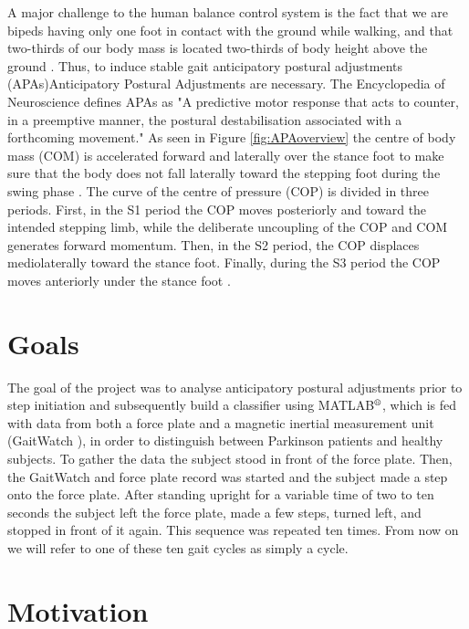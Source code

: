 A major challenge to the human balance control system is the fact that we are bipeds having only one foot in contact with the ground while walking, and that two-thirds  of our body mass is located two-thirds of body height above the ground \cite{halliday_initiation_1998}. Thus, to induce stable gait anticipatory postural adjustments (APAs){Anticipatory Postural Adjustments} are necessary. The Encyclopedia of Neuroscience \cite[p.133]{woollacott_anticipatory_2009} defines APAs as "A predictive motor response that acts to counter, in a preemptive manner, the postural destabilisation associated with a forthcoming movement." As seen in Figure \ref{fig:APAoverview} the centre of body mass (COM) is accelerated forward and laterally over the stance foot to make sure that the body does not fall laterally toward the stepping foot during the swing phase \cite{woollacott_anticipatory_2009}. The curve of the centre of pressure (COP) is divided in three periods. First, in the S1 period the COP moves posteriorly and toward the intended stepping limb, while the deliberate uncoupling of the COP and COM generates forward momentum. Then, in the S2 period, the COP displaces mediolaterally toward the stance foot. Finally, during the S3 period the COP moves anteriorly under the stance foot \cite{hass_gait_2005-1}.




\section{Goals}
\label{data_gathering_protocol}
The goal of the project was to analyse anticipatory postural adjustments prior to step initiation and subsequently build a classifier using MATLAB$\textsuperscript{\textregistered}$, which is fed with data from both a force plate and a magnetic inertial measurement unit (GaitWatch \cite{olivares_vicente_gaitwatch_2013}), in order to distinguish between Parkinson patients and healthy subjects. To gather the data the subject stood in front of the force plate. Then, the GaitWatch and force plate record was started and the subject made a step onto the force plate. After standing upright for a variable time of two to ten seconds the subject left the force plate, made a few steps, turned left, and stopped in front of it again. This sequence was repeated ten times. From now on we will refer to one of these ten gait cycles as simply a cycle.


\section{Motivation}

